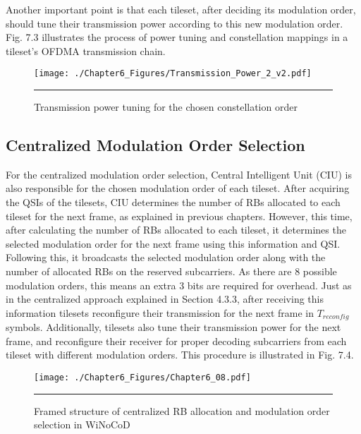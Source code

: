 Another important point is that each tileset, after deciding its modulation order, should tune their transmission power according to this new modulation order. Fig. 7.3 illustrates the process of power tuning and constellation mappings in a tileset's OFDMA transmission chain. 

\begin{figure}[htbp]
  \centering
    \texttt{[image: ./Chapter6\_Figures/Transmission\_Power\_2\_v2.pdf]}
    \rule{35em}{0.5pt}
  \caption[Transmission power tuning for the chosen constellation order]{Transmission power tuning for the chosen constellation order} 
  \label{fig:Electron}
\end{figure}

\subsection{Centralized Modulation Order Selection}

For the centralized modulation order selection, Central Intelligent Unit (CIU) is also responsible for the chosen modulation order of each tileset. After acquiring the QSIs of the tilesets, CIU determines the number of RBs allocated to each tileset for the next frame, as explained in previous chapters. However, this time, after calculating the number of RBs allocated to each tileset, it determines the selected modulation order for the next frame using this information and QSI. Following this, it broadcasts the selected modulation order along with the number of allocated RBs on the reserved subcarriers. As there are 8 possible modulation orders, this means an extra 3 bits are required for overhead. Just as in the centralized approach explained in Section 4.3.3, after  receiving this information tilesets reconfigure their transmission for the next frame in $T_{reconfig}$ symbols. Additionally, tilesets also tune their transmission power for the next frame, and reconfigure their receiver for proper decoding subcarriers from each tileset with different modulation orders. This procedure is illustrated in Fig. 7.4.  

\begin{figure}[htbp]
  \centering
    \texttt{[image: ./Chapter6\_Figures/Chapter6\_08.pdf]}
    \rule{35em}{0.5pt}
  \caption[Centralized RB allocation and modulation order selection in WiNoCoD]{Framed structure of centralized RB allocation and modulation order selection in WiNoCoD} 
  \label{fig:Electron}
\end{figure}

